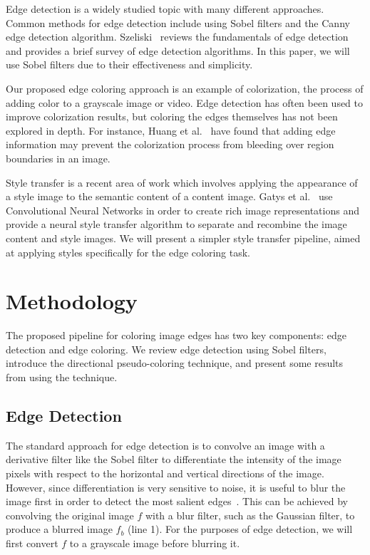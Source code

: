 \documentclass{article}
\begin{document}
Edge detection is a widely studied topic with many different approaches. Common methods for edge detection include using Sobel filters and the Canny edge detection algorithm. Szeliski~\cite{cv_book} reviews the fundamentals of edge detection and provides a brief survey of edge detection algorithms. In this paper, we will use Sobel filters due to their effectiveness and simplicity.

Our proposed edge coloring approach is an example of colorization, the process of adding color to a grayscale image or video. Edge detection has often been used to improve colorization results, but coloring the edges themselves has not been explored in depth. For instance, Huang et al.~\cite{Huang} have found that adding edge information may prevent the colorization process from bleeding over region boundaries in an image. 

Style transfer is a recent area of work which involves applying the appearance of a style image to the semantic content of a content image. Gatys et al.~\cite{Gatys} use Convolutional Neural Networks in order to create rich image representations and provide a neural style transfer algorithm to separate and recombine the image content and style images. We will present a simpler style transfer pipeline, aimed at applying styles specifically for the edge coloring task.

\section{Methodology}

The proposed pipeline for coloring image edges has two key components: edge detection and edge coloring. We review edge detection using Sobel filters, introduce the directional pseudo-coloring technique, and present some results from using the technique.

\subsection{Edge Detection}

The standard approach for edge detection is to convolve an image with a derivative filter like the Sobel filter to differentiate the intensity of the image pixels with respect to the horizontal and vertical directions of the image. However, since differentiation is very sensitive to noise, it is useful to blur the image first in order to detect the most salient edges~\cite{filtering_lecture}. This can be achieved by convolving the original image $f$ with a blur filter, such as the Gaussian filter, to produce a blurred image $f_b$ (line 1). For the purposes of edge detection, we will first convert $f$ to a grayscale image before blurring it.
\end{document}
